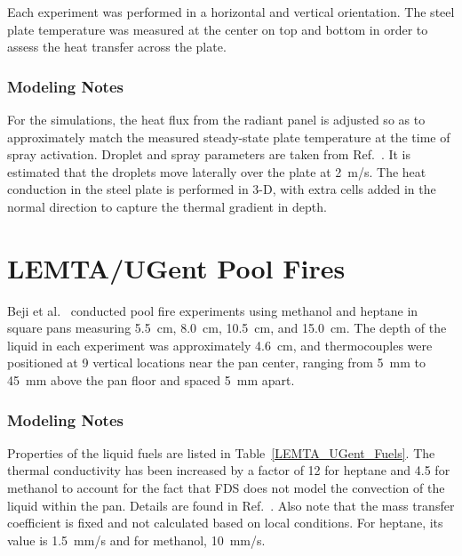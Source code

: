 Each experiment was performed in a horizontal and vertical orientation. The steel plate temperature was measured at the center on top and bottom in order to assess the heat transfer across the plate.

\subsubsection{Modeling Notes}

For the simulations, the heat flux from the radiant panel is adjusted so as to approximately match the measured steady-state plate temperature at the time of spray activation. Droplet and spray parameters are taken from Ref.~\cite{Acem:ISFEH2022}. It is estimated that the droplets move laterally over the plate at 2~m/s. The heat conduction in the steel plate is performed in 3-D, with extra cells added in the normal direction to capture the thermal gradient in depth.


\section{LEMTA/UGent Pool Fires}
\label{LEMTA_UGent_Pool_Fires_Description}

Beji et al.~\cite{Beji:FSJ2024} conducted pool fire experiments using methanol and heptane in square pans measuring 5.5~cm, 8.0~cm, 10.5~cm, and 15.0~cm. The depth of the liquid in each experiment was approximately 4.6~cm, and thermocouples were positioned at 9 vertical locations near the pan center, ranging from 5~mm to 45~mm above the pan floor and spaced 5~mm apart.

\subsubsection{Modeling Notes}

Properties of the liquid fuels are listed in Table~\ref{LEMTA_UGent_Fuels}. The thermal conductivity has been increased by a factor of 12 for heptane and 4.5 for methanol to account for the fact that FDS does not model the convection of the liquid within the pan. Details are found in Ref.~\cite{Beji:FSJ2024}. Also note that the mass transfer coefficient is fixed and not calculated based on local conditions. For heptane, its value is 1.5~mm/s and for methanol, 10~mm/s.

